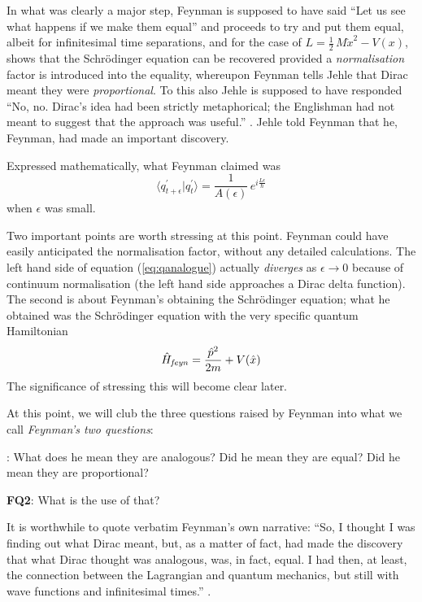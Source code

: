 \documentclass[12pt]{article}
\newcommand{\be}{\begin{equation}}
\newcommand{\ee}{\end{equation}}
\begin{document}
In what was clearly a major step, Feynman is supposed to have said ``Let us see what happens if we make them equal'' and proceeds to try 
and put them equal, albeit for infinitesimal time separations, and
for the case of $L = \frac{1}{2}\,M{\dot x}^2 - V(x)$, shows that the Schr\"odinger equation can be recovered provided a 
{\it normalisation} factor is introduced into the equality, whereupon Feynman tells Jehle that Dirac meant they were {\it proportional}. To
this also Jehle is supposed to have responded ``No, no. Dirac's idea had been strictly metaphorical; the Englishman had not meant to
suggest that the approach was useful.'' \cite{gleick}. Jehle told Feynman that he, Feynman, had made an important discovery.

Expressed mathematically, what Feynman claimed was
\be
\label{eq:missinglink0}
\langle q_{t + \epsilon}^\prime|q_t^\prime\rangle = \frac{1}{A(\epsilon)}\,e^{i \frac{L \epsilon}{\hbar}}
\ee
when $\epsilon$ was small.


Two important points are worth stressing at this point. Feynman could have easily anticipated the normalisation factor, without any
detailed calculations. The left hand side of equation (\ref{eq:qanalogue}) actually \emph{diverges} as $\epsilon \rightarrow 0$ because of continuum 
normalisation (the left hand side approaches a Dirac delta function). The second is about Feynman's obtaining the Schr\"odinger equation;
what he obtained was the Schr\"odinger equation with the very specific quantum Hamiltonian
\be
\label{eq:feynHq}
{\hat H}_{\it feyn} = \frac{{\hat p}^2}{2m} + V({\hat x})
\ee
The significance of stressing this will become clear later.

At this point, we will club the three questions raised by Feynman into what we call \emph{Feynman's two questions}:

\medskip
{}: What does he mean they are analogous? Did he mean they are equal? Did he mean they are proportional?

\medskip
\noindent
{\bf FQ2}: What is the use of that?

\noindent
It is worthwhile to quote verbatim Feynman's own narrative: ``So, I thought I was finding out what Dirac meant, but, as a matter of fact, 
had made the discovery that what Dirac thought was analogous, was, in fact, equal. I had then, at least, the connection between the 
Lagrangian and quantum mechanics, but still with wave functions and infinitesimal times.'' \cite{nobel}.
\end{document}
